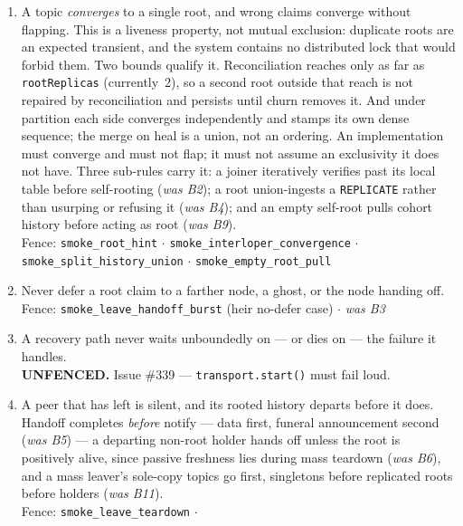 \documentclass[nobib]{tufte-handout}
\begin{document}
\begingroup\sloppy
\begin{enumerate}
\item[\textbf{I-1}] A topic \emph{converges} to a single root, and wrong
  claims converge without flapping. This is a liveness property, not
  mutual exclusion: duplicate roots are an expected transient, and the
  system contains no distributed lock that would forbid them. Two bounds
  qualify it. Reconciliation reaches only as far as
  \texttt{rootReplicas} (currently~2), so a second root outside that
  reach is not repaired by reconciliation and persists until churn
  removes it. And under partition each side converges independently and
  stamps its own dense sequence; the merge on heal is a union, not an
  ordering. An implementation must converge and must not flap; it must
  not assume an exclusivity it does not have. Three sub-rules carry it:
  a joiner iteratively verifies past its local table before self-rooting
  (\emph{was B2}); a root union-ingests a \texttt{REPLICATE} rather than
  usurping or refusing it (\emph{was B4}); and an empty self-root pulls
  cohort history before acting as root (\emph{was B9}).\\
  {\footnotesize\textsf{Fence:} \texttt{smoke\_root\_hint} $\cdot$
  \texttt{smoke\_interloper\_convergence} $\cdot$
  \texttt{smoke\_split\_history\_union} $\cdot$
  \texttt{smoke\_empty\_root\_pull}}
\item[\textbf{I-2}] Never defer a root claim to a farther node, a
  ghost, or the node handing off.\\
  {\footnotesize\textsf{Fence:} \texttt{smoke\_leave\_handoff\_burst}
  (heir no-defer case) $\cdot$ \emph{was B3}}
\item[\textbf{I-3}] A recovery path never waits unboundedly on --- or
  dies on --- the failure it handles.\\
  {\footnotesize\textbf{UNFENCED.} Issue \#339 ---
  \texttt{transport.start()} must fail loud.}
\item[\textbf{I-4}] A peer that has left is silent, and its rooted
  history departs before it does. Handoff completes \emph{before}
  notify --- data first, funeral announcement second (\emph{was B5}) ---
  a departing non-root holder hands off unless the root is positively
  alive, since passive freshness lies during mass teardown (\emph{was
  B6}), and a mass leaver's sole-copy topics go first, singletons before
  replicated roots before holders (\emph{was B11}).\\
  {\footnotesize\textsf{Fence:} \texttt{smoke\_leave\_teardown} $\cdot$
}
\end{enumerate}
\end{document}
